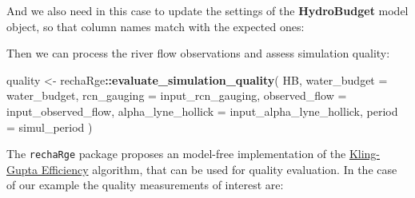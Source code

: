 \documentclass[
]{book}
\newenvironment{Shaded}{\begin{snugshade}}{\end{snugshade}}
\newcommand{\AttributeTok}[1]{\textcolor[rgb]{0.13,0.29,0.53}{#1}}
\newcommand{\FunctionTok}[1]{\textcolor[rgb]{0.13,0.29,0.53}{\textbf{#1}}}
\newcommand{\NormalTok}[1]{#1}
\newcommand{\OtherTok}[1]{\textcolor[rgb]{0.56,0.35,0.01}{#1}}
\newcommand{\SpecialCharTok}[1]{\textcolor[rgb]{0.81,0.36,0.00}{\textbf{#1}}}
\newcommand{\StringTok}[1]{\textcolor[rgb]{0.31,0.60,0.02}{#1}}
\begin{document}
And we also need in this case to update the settings of the \textbf{HydroBudget} model object, so that column names match with the expected ones:

\begin{Shaded}
\end{Shaded}

Then we can process the river flow observations and assess simulation quality:

\begin{Shaded}
\begin{Highlighting}[]
\NormalTok{quality }\OtherTok{\textless{}{-}}\NormalTok{ rechaRge}\SpecialCharTok{::}\FunctionTok{evaluate\_simulation\_quality}\NormalTok{(}
\NormalTok{  HB,}
  \AttributeTok{water\_budget =}\NormalTok{ water\_budget,}
  \AttributeTok{rcn\_gauging =}\NormalTok{ input\_rcn\_gauging,}
  \AttributeTok{observed\_flow =}\NormalTok{ input\_observed\_flow,}
  \AttributeTok{alpha\_lyne\_hollick =}\NormalTok{ input\_alpha\_lyne\_hollick,}
  \AttributeTok{period =}\NormalTok{ simul\_period}
\NormalTok{)}
\end{Highlighting}
\end{Shaded}

The \texttt{rechaRge} package proposes an model-free implementation of the \href{https://en.wikipedia.org/wiki/Kling\%E2\%80\%93Gupta_efficiency}{Kling-Gupta Efficiency} algorithm, that can be used for quality evaluation. In the case of our example the quality measurements of interest are:

\begin{Shaded}
\end{Shaded}
\end{document}
